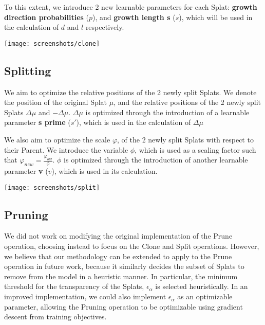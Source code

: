 \documentclass[11pt]{report}
\begin{document}
To this extent, we introduce 2 new learnable parameters for each Splat: \textbf{growth direction probabilities} ($p$), and \textbf{growth length s} ($s$), which will be used in the calculation of $d$ and $l$ respectively.

\begin{center}
\begin{minipage}{0.4\linewidth}
\texttt{[image: screenshots/clone]}
\end{minipage}
\end{center}

\subsection{Splitting}
We aim to optimize the relative positions of the 2 newly split Splats. We denote the position of the original Splat $\mu$, and the relative positions of the 2 newly split Splats $\Delta \mu$ and $- \Delta \mu$. $\Delta \mu$ is optimized through the introduction of a learnable parameter \textbf{s prime} ($s'$), which is used in the calculation of $\Delta \mu$

We also aim to optimize the scale $\varphi$, of the 2 newly split Splats with respect to their Parent. We introduce the variable $\phi$, which is used as a scaling factor such that $\varphi_{new} = \frac{\varphi_{old}}{\phi}$. $\phi$ is optimized through the introduction of another learnable parameter \textbf{v} ($v$), which is used in its calculation.

\begin{center}
\begin{minipage}{0.4\linewidth}
\texttt{[image: screenshots/split]}
\end{minipage}
\end{center}

\subsection{Pruning}
We did not work on modifying the original implementation of the Prune operation, choosing instead to focus on the Clone and Split operations. However, we believe that our methodology can be extended to apply to the Prune operation in future work, because it similarly decides the subset of Splats to remove from the model in a heuristic manner. In particular, the minimum threshold for the transparency of the Splats, $\epsilon_{\alpha}$ is selected heuristically. In an improved implementation, we could also implement $\epsilon_{\alpha}$ as an optimizable parameter, allowing the Pruning operation to be optimizable using gradient descent from training objectives.
\end{document}
